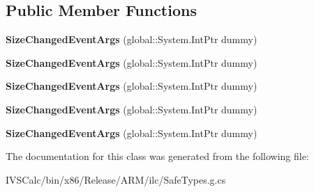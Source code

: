 \subsection*{Public Member Functions}
\begin{DoxyCompactItemize}
\item 
\mbox{\label{class_windows_1_1_u_i_1_1_xaml_1_1_size_changed_event_args_ade8d7e791583b45449dd514482786264}} 
{\bfseries Size\+Changed\+Event\+Args} (global\+::\+System.\+Int\+Ptr dummy)
\item 
\mbox{\label{class_windows_1_1_u_i_1_1_xaml_1_1_size_changed_event_args_ade8d7e791583b45449dd514482786264}} 
{\bfseries Size\+Changed\+Event\+Args} (global\+::\+System.\+Int\+Ptr dummy)
\item 
\mbox{\label{class_windows_1_1_u_i_1_1_xaml_1_1_size_changed_event_args_ade8d7e791583b45449dd514482786264}} 
{\bfseries Size\+Changed\+Event\+Args} (global\+::\+System.\+Int\+Ptr dummy)
\item 
\mbox{\label{class_windows_1_1_u_i_1_1_xaml_1_1_size_changed_event_args_ade8d7e791583b45449dd514482786264}} 
{\bfseries Size\+Changed\+Event\+Args} (global\+::\+System.\+Int\+Ptr dummy)
\item 
\mbox{\label{class_windows_1_1_u_i_1_1_xaml_1_1_size_changed_event_args_ade8d7e791583b45449dd514482786264}} 
{\bfseries Size\+Changed\+Event\+Args} (global\+::\+System.\+Int\+Ptr dummy)
\end{DoxyCompactItemize}


The documentation for this class was generated from the following file\+:\begin{DoxyCompactItemize}
\item 
I\+V\+S\+Calc/bin/x86/\+Release/\+A\+R\+M/ilc/Safe\+Types.\+g.\+cs\end{DoxyCompactItemize}
